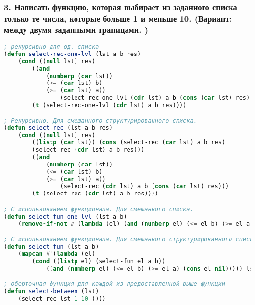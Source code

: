 \subsubsection*{3. Написать функцию, которая выбирает из заданного списка только те числа, которые больше 1 и меньше 10. (Вариант: между двумя заданными границами. )}
\begin{lstlisting}[language=Lisp]
; рекурсивно для од. списка
(defun select-rec-one-lvl (lst a b res)
	(cond ((null lst) res)
		((and 
			(numberp (car lst)) 
			(<= (car lst) b) 
			(>= (car lst) a)) 
				(select-rec-one-lvl (cdr lst) a b (cons (car lst) res)))
		(t (select-rec-one-lvl (cdr lst) a b res))))

; Рекурсивно. Для смешанного структурированного списка.
(defun select-rec (lst a b res)
	(cond ((null lst) res)
		((listp (car lst)) (cons (select-rec (car lst) a b res)
		(select-rec (cdr lst) a b res)))
		((and
			(numberp (car lst))
			(<= (car lst) b) 
			(>= (car lst) a)) 
				(select-rec (cdr lst) a b (cons (car lst) res)))
		(t (select-rec (cdr lst) a b res))))

; С использованием функционала. Для смешанного списка.
(defun select-fun-one-lvl (lst a b)
	(remove-if-not #'(lambda (el) (and (numberp el) (<= el b) (>= el a))) lst))

; С использованием функционала. Для смешанного структурированного списка.
(defun select-fun (lst a b)
	(mapcan #'(lambda (el) 
		(cond ((listp el) (select-fun el a b))
			((and (numberp el) (<= el b) (>= el a) (cons el nil))))) lst))

; оберточная функция для каждой из предоставленной выше функции
(defun select-between (lst)
	(select-rec lst 1 10 ()))
\end{lstlisting}

